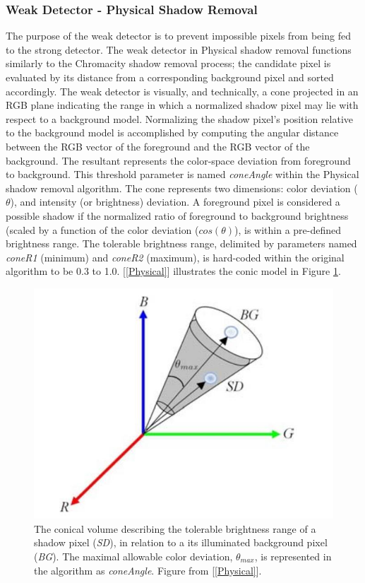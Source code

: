 \subsubsection{Weak Detector - Physical Shadow Removal}

The purpose of the weak detector is to prevent impossible pixels from being fed to the strong detector. The weak detector in Physical shadow removal functions similarly to the Chromacity shadow removal process; the candidate pixel is evaluated by its distance from a corresponding background pixel and sorted accordingly. The weak detector is visually, and technically, a cone projected in an RGB plane indicating the range in which a normalized shadow pixel may lie with respect to a background model. Normalizing the shadow pixel's position relative to the background model is accomplished by computing the angular distance between the RGB vector of the foreground and the RGB vector of the background. The resultant represents the color-space deviation from foreground to background. This threshold parameter is named \textit{coneAngle} within the Physical shadow removal algorithm. The cone represents two dimensions: color deviation ($\theta$), and intensity (or brightness) deviation. A foreground pixel is considered a possible shadow if the normalized ratio of foreground to background brightness (scaled by a function of the color deviation ($cos(\theta)$), is within a pre-defined brightness range. The tolerable brightness range, delimited by parameters named \textit{coneR1} (minimum) and \textit{coneR2} (maximum), is hard-coded within the original algorithm to be 0.3 to 1.0. [\ref{Physical}] illustrates the conic model in Figure \ref{fig:cone_physical}.

\begin{figure}
  \centering
  \includegraphics[width=.8\linewidth]{figures/cone_physical.jpg}
  \caption{The conical volume describing the tolerable brightness range of a shadow pixel (\textit{SD}), in relation to a its illuminated background pixel (\textit{BG}). The maximal allowable color deviation, $\theta_{max}$, is represented in the algorithm as \textit{coneAngle}. Figure from [\ref{Physical}].}
  \label{fig:cone_physical}
\end{figure}

